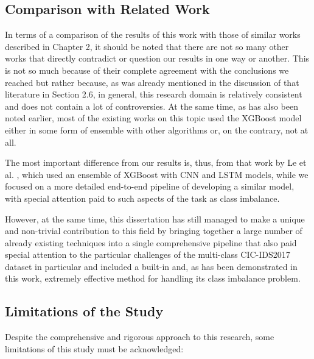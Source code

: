 \subsection{Comparison with Related Work}

In terms of a comparison of the results of this work with those of similar works described in Chapter 2, it should be noted that there are not so many other works that directly contradict or question our results in one way or another. This is not so much because of their complete agreement with the conclusions we reached but rather because, as was already mentioned in the discussion of that literature in Section 2.6, in general, this research domain is relatively consistent and does not contain a lot of controversies. At the same time, as has also been noted earlier, most of the existing works on this topic used the XGBoost model either in some form of ensemble with other algorithms or, on the contrary, not at all.

The most important difference from our results is, thus, from that work by Le et al. \cite{le2021ensemble}, which used an ensemble of XGBoost with CNN and LSTM models, while we focused on a more detailed end-to-end pipeline of developing a similar model, with special attention paid to such aspects of the task as class imbalance.

However, at the same time, this dissertation has still managed to make a unique and non-trivial contribution to this field by bringing together a large number of already existing techniques into a single comprehensive pipeline that also paid special attention to the particular challenges of the multi-class CIC-IDS2017 dataset in particular and included a built-in and, as has been demonstrated in this work, extremely effective method for handling its class imbalance problem.

\subsection{Limitations of the Study}

Despite the comprehensive and rigorous approach to this research, some limitations of this study must be acknowledged:

